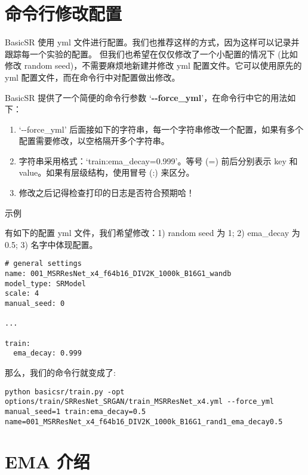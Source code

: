 \documentclass[../main.tex]{subfiles}
\begin{document}
\section{命令行修改配置}\label{others:yml_modification_with_commands}

BasicSR 使用 yml 文件进行配置。我们也推荐这样的方式，因为这样可以记录并跟踪每一个实验的配置。
但我们也希望在仅仅修改了一个小配置的情况下 (比如修改 random seed)，不需要麻烦地新建并修改 yml 配置文件。它可以使用原先的 yml 配置文件，而在命令行中对配置做出修改。

BasicSR 提供了一个简便的命令行参数 ‘\textbf{-{}-force\_yml}’，在命令行中它的用法如下：

\begin{enumerate}
	\item ‘-{}-force\_yml’ 后面接如下的字符串，每一个字符串修改一个配置，如果有多个配置需要修改，以空格隔开多个字符串。
	\item 字符串采用格式：‘train:ema\_decay=0.999’。等号 (=) 前后分别表示 key 和 value。如果有层级结构，使用冒号 (:) 来区分。
	\item 修改之后记得检查打印的日志是否符合预期哈！
\end{enumerate}

\begin{exampleBox}[]{示例}

	有如下的配置 yml 文件，我们希望修改：1) random seed 为 1; 2) ema\_decay 为0.5; 3) 名字中体现配置。

	\begin{verbatim}
# general settings
name: 001_MSRResNet_x4_f64b16_DIV2K_1000k_B16G1_wandb
model_type: SRModel
scale: 4
manual_seed: 0

...

train:
  ema_decay: 0.999
	\end{verbatim}

	那么，我们的命令行就变成了:
	\begin{verbatim}
python basicsr/train.py -opt options/train/SRResNet_SRGAN/train_MSRResNet_x4.yml --force_yml manual_seed=1 train:ema_decay=0.5 name=001_MSRResNet_x4_f64b16_DIV2K_1000k_B16G1_rand1_ema_decay0.5
	\end{verbatim}
\end{exampleBox}


\section{EMA 介绍}\label{others:ema}
\end{document}
